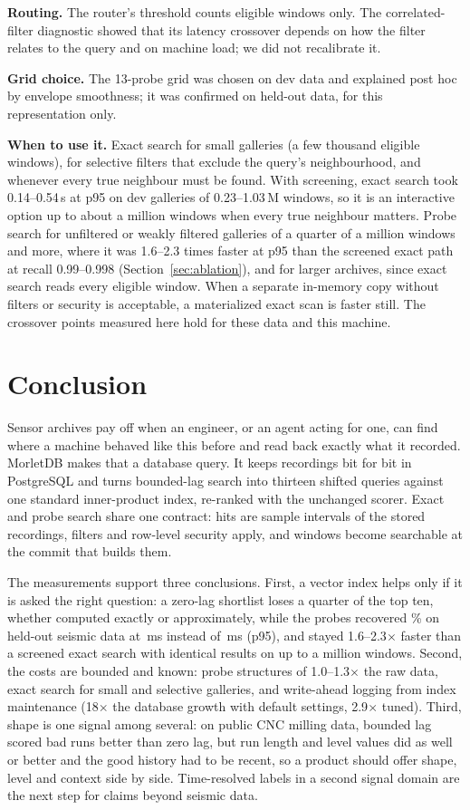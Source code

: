 \documentclass[sigconf]{acmart}
\newcommand{\M}{MorletDB}
\begin{document}
\textbf{Routing.} The router's threshold counts eligible windows only. The correlated-filter diagnostic showed that its latency crossover depends on how the filter relates to the query and on machine load; we did not recalibrate it.

\textbf{Grid choice.} The 13-probe grid was chosen on dev data and explained post hoc by envelope smoothness; it was confirmed on held-out data, for this representation only.

\textbf{When to use it.} Exact search for small galleries (a few thousand eligible windows), for selective filters that exclude the query's neighbourhood, and whenever every true neighbour must be found. With screening, exact search took 0.14--0.54\,s at p95 on dev galleries of 0.23--1.03\,M windows, so it is an interactive option up to about a million windows when every true neighbour matters. Probe search for unfiltered or weakly filtered galleries of a quarter of a million windows and more, where it was 1.6--2.3 times faster at p95 than the screened exact path at recall 0.99--0.998 (Section~\ref{sec:ablation}), and for larger archives, since exact search reads every eligible window. When a separate in-memory copy without filters or security is acceptable, a materialized exact scan is faster still. The crossover points measured here hold for these data and this machine.

\section{Conclusion}
Sensor archives pay off when an engineer, or an agent acting for one, can find where a machine behaved like this before and read back exactly what it recorded. \M{} makes that a database query. It keeps recordings bit for bit in PostgreSQL and turns bounded-lag search into thirteen shifted queries against one standard inner-product index, re-ranked with the unchanged scorer. Exact and probe search share one contract: hits are sample intervals of the stored recordings, filters and row-level security apply, and windows become searchable at the commit that builds them.

The measurements support three conclusions. First, a vector index helps only if it is asked the right question: a zero-lag shortlist loses a quarter of the top ten, whether computed exactly or approximately, while the probes recovered \EHoPctPR\% on held-out seismic data at \EHoPninetyfivePR\,ms instead of \EHoPninetyfiveExact\,ms (p95), and stayed 1.6--2.3$\times$ faster than a screened exact search with identical results on up to a million windows. Second, the costs are bounded and known: probe structures of 1.0--1.3$\times$ the raw data, exact search for small and selective galleries, and write-ahead logging from index maintenance (18$\times$ the database growth with default settings, 2.9$\times$ tuned). Third, shape is one signal among several: on public CNC milling data, bounded lag scored bad runs better than zero lag, but run length and level values did as well or better and the good history had to be recent, so a product should offer shape, level and context side by side. Time-resolved labels in a second signal domain are the next step for claims beyond seismic data.
\end{document}
